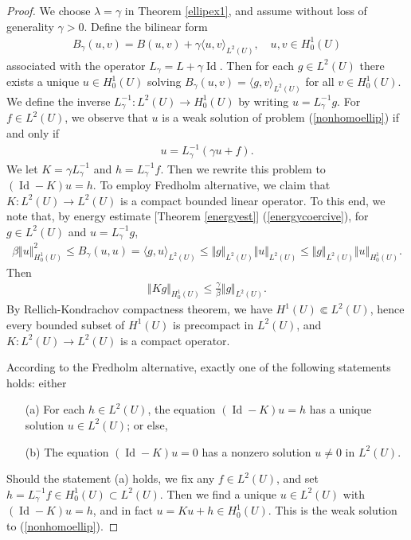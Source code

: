 \documentclass{article}
\numberwithin{equation}{section}
\DeclareMathOperator{\id}{Id}
\theoremstyle{plain}
\theoremstyle{definition}
\begin{document}
\begin{proof}
We choose $\lambda=\gamma$ in Theorem \ref{ellipex1}, and assume without loss of generality $\gamma>0$. Define the bilinear form
\begin{align*}
	B_\gamma(u,v)=B(u,v)+\gamma\langle u,v\rangle_{L^2(U)},\quad u,v\in H_0^1(U)
\end{align*}
associated with the operator $L_\gamma=L+\gamma\id$. Then for each $g\in L^2(U)$ there exists a unique $u\in H_0^1(U)$ solving $B_\gamma(u,v)=\langle g,v\rangle_{L^2(U)}$ for all $v\in H_0^1(U)$. We define the inverse $L_\gamma^{-1}:L^2(U)\to H_0^1(U)$ by writing $u=L_\gamma^{-1}g$. For $f\in L^2(U)$, we observe that $u$ is a weak solution of problem (\ref{nonhomoellip}) if and only if
\begin{align*}
	u=L_\gamma^{-1}(\gamma u+f).
\end{align*}
We let $K=\gamma L_\gamma^{-1}$ and $h=L^{-1}_\gamma f$. Then we rewrite this problem to $(\id -K)u=h$. To employ Fredholm alternative, we claim that $K:L^2(U)\to L^2(U)$ is a compact bounded linear operator. To this end, we note that, by energy estimate [Theorem \ref{energyest}] (\ref{energycoercive}), for $g\in L^2(U)$ and $u=L^{-1}_\gamma g$,
\begin{align*}
	\beta\Vert u\Vert_{H_0^1(U)}^2 \leq B_\gamma(u,u)=\langle g,u\rangle_{L^2(U)}\leq\Vert g\Vert_{L^2(U)}\Vert u\Vert_{L^2(U)}\leq\Vert g\Vert_{L^2(U)}\Vert u\Vert_{H_0^1(U)}.
\end{align*}
Then
\begin{align*}
	\Vert Kg\Vert_{H_0^1(U)}\leq\frac{\gamma}{\beta}\Vert g\Vert_{L^2(U)}.
\end{align*}
By Rellich-Kondrachov compactness theorem, we have $H^1(U)\Subset L^2(U)$, hence every bounded subset of $H^1(U)$ is precompact in $L^2(U)$, and $K:L^2(U)\to L^2(U)$ is a compact operator.

According to the Fredholm alternative, exactly one of the following statements holds: either
\begin{itemize}
	\item[(a)] For each $h\in L^2(U)$, the equation $(\id -K)u=h$ has a unique solution $u\in L^2(U)$; or else,
	\item[(b)] The equation $(\id-K)u=0$ has a nonzero solution $u\neq 0$ in $L^2(U)$.
\end{itemize}

Should the statement (a) holds, we fix any $f\in L^2(U)$, and set $h=L_\gamma^{-1}f\in H_0^1(U)\subset L^2(U)$. Then we find a unique $u\in L^2(U)$ with $(\id-K)u=h$, and in fact $u=Ku+h\in H_0^1(U)$. This is the weak solution to (\ref{nonhomoellip}).


\end{proof}
\end{document}

